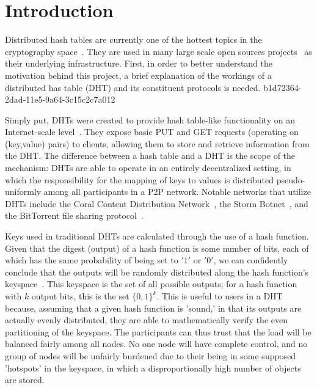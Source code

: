 \documentclass[12pt]{article}
\begin{document}
\section{Introduction}
\par Distributed hash tables are currently one of the hottest topics in the cryptography space~\cite{Stoica:2001dj,Rowstron:2001ea,Ratnasamy:2001wn}. They are used in many large scale open sources projects~\cite{Freitas:2013tb,Xu:2010vs,Perfitt:2010fh} as their underlying infrastructure. First, in order to better understand the motivation behind this project, a brief explanation of the workings of a distributed has table (DHT) and its constituent protocols is needed.
b1d72364-2dad-11e5-9a64-3c15c2c7a012
\par Simply put, DHTs were created to provide hash table-like functionality on an Internet-scale level~\cite{Ratnasamy:2001wn}. They expose basic PUT and GET requests (operating on (key,value) pairs) to clients, allowing them to store and retrieve information from the DHT. The difference between a hash table and a DHT is the scope of the mechanism: DHTs are able to operate in an entirely decentralized setting, in which the responsibility for the mapping of keys to values is distributed pseudo-uniformly among all participants in a P2P network. Notable networks that utilize DHTs include the Coral Content Distribution Network~\cite{Freedman:2004vb}, the Storm Botnet~\cite{Holz:2008uk}, and the BitTorrent file sharing protocol~\cite{Cohen:y1_8mBnw}.

\par Keys used in traditional DHTs are calculated through the use of a hash function. Given that the digest (output) of a hash function is some number of bits, each of which has the same probability of being set to $'1'$ or $'0'$, we can confidently conclude that the outputs will be randomly distributed along the hash function's keyspace~. This keyspace is the set of all possible outputs; for a hash function with $k$ output bits, this is the set $\{0,1\}^k$. This is useful to users in a DHT because, assuming that a given hash function is 'sound,' in that its outputs are actually evenly distributed, they are able to mathematically verify the even partitioning of the keyspace. The participants can thus trust that the load will be balanced fairly among all nodes. No one node will have complete control, and no group of nodes will be unfairly burdened due to their being in some supposed 'hotspots' in the keyspace, in which a disproportionally high number of objects are stored.~
\end{document}
